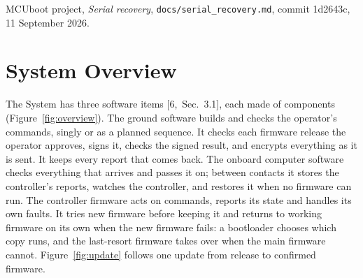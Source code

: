 \documentclass[11pt,a4paper]{article}
\begin{document}
\noindent [13] MCUboot project, \emph{Serial recovery},
\texttt{docs/serial\_recovery.md}, commit 1d2643c, 11 September 2026.

\section{System Overview}
\label{sec:overview}
The System has three software items [6,~Sec.~3.1], each made of components
(Figure~\ref{fig:overview}). The ground software builds and checks
the operator's commands, singly or as a planned sequence. It checks each
firmware release the operator approves, signs it, checks the signed result,
and encrypts everything as it is sent. It keeps every report that comes back. The onboard computer software checks everything that arrives and passes
it on; between contacts it stores the controller's reports, watches the
controller, and restores it when no firmware can run. The controller firmware
acts on commands, reports its state and handles its own faults. It tries new
firmware before keeping it and returns to working firmware on its own when the
new firmware fails: a bootloader chooses which copy runs, and the
last-resort firmware takes over when the main firmware cannot.
Figure~\ref{fig:update} follows one update from release to confirmed firmware.
\end{document}
